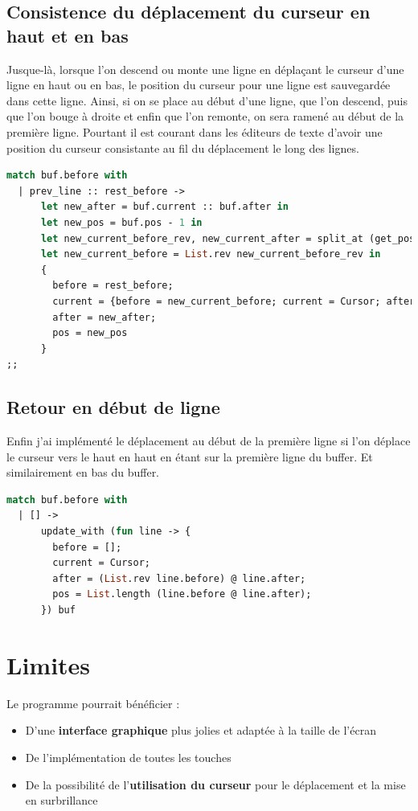 \documentclass[a4paper,12pt]{article}
\begin{document}
\subsection{Consistence du déplacement du curseur en haut et en bas}
Jusque-là, lorsque l'on descend ou monte une ligne en déplaçant le curseur d'une ligne en haut ou en bas, le position du curseur pour une ligne est sauvegardée dans cette ligne. Ainsi, si on se place au début d'une ligne, que l'on descend, puis que l'on bouge à droite et enfin que l'on remonte, on sera ramené au début de la première ligne. Pourtant il est courant dans les éditeurs de texte d'avoir une position du curseur consistante au fil du déplacement le long des lignes.
\begin{lstlisting}[language=Caml, caption=Implémentation du déplacement ligne en ligne ergonomique extrait de \texttt{move\_up}]
match buf.before with
  | prev_line :: rest_before ->
      let new_after = buf.current :: buf.after in
      let new_pos = buf.pos - 1 in
      let new_current_before_rev, new_current_after = split_at (get_pos buf.current) ((List.rev prev_line.before) @ prev_line.after) in
      let new_current_before = List.rev new_current_before_rev in
      {
        before = rest_before;
        current = {before = new_current_before; current = Cursor; after = new_current_after; pos = get_pos buf.current};
        after = new_after;
        pos = new_pos
      }
;;
\end{lstlisting}

\subsection{Retour en début de ligne}
Enfin j'ai implémenté le déplacement au début de la première ligne si l'on déplace le curseur vers le haut en haut en étant sur la première ligne du buffer. Et similairement en bas du buffer.

\begin{lstlisting}[language=Caml, caption=Implémentation du retour en début de ligne en début de buffer dans \texttt{move\_up}]
match buf.before with
  | [] ->
      update_with (fun line -> {
        before = [];
        current = Cursor;
        after = (List.rev line.before) @ line.after;
        pos = List.length (line.before @ line.after);
      }) buf
\end{lstlisting}

\section{Limites}
Le programme pourrait bénéficier : 
\begin{itemize}
  \item D'une \textbf{interface graphique} plus jolies et adaptée à la taille de l'écran
  \item De l'implémentation de toutes les touches
  \item De la possibilité de l'\textbf{utilisation du curseur} pour le déplacement et la mise en surbrillance
\end{itemize}
\end{document}
